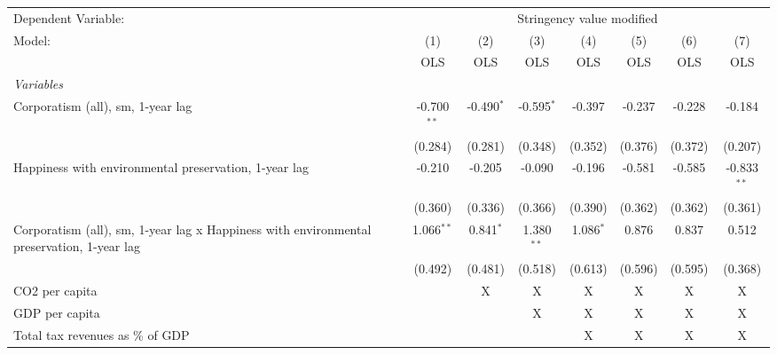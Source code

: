
\begingroup
\centering
\begin{tabular}{lccccccc}
   \toprule
   Dependent Variable: & \multicolumn{7}{c}{Stringency value modified}\\
   Model:                                                                                    & (1)           & (2)          & (3)          & (4)         & (5)     & (6)     & (7)\\  
                                                                                             &  OLS          & OLS          & OLS          & OLS         & OLS     & OLS     & OLS\\  
   \midrule
   \emph{Variables}\\
   Corporatism (all), sm, 1-year lag                                                         & -0.700$^{**}$ & -0.490$^{*}$ & -0.595$^{*}$ & -0.397      & -0.237  & -0.228  & -0.184\\   
                                                                                             & (0.284)       & (0.281)      & (0.348)      & (0.352)     & (0.376) & (0.372) & (0.207)\\   
   Happiness with environmental preservation, 1-year lag                                     & -0.210        & -0.205       & -0.090       & -0.196      & -0.581  & -0.585  & -0.833$^{**}$\\   
                                                                                             & (0.360)       & (0.336)      & (0.366)      & (0.390)     & (0.362) & (0.362) & (0.361)\\   
   Corporatism (all), sm, 1-year lag x Happiness with environmental preservation, 1-year lag & 1.066$^{**}$  & 0.841$^{*}$  & 1.380$^{**}$ & 1.086$^{*}$ & 0.876   & 0.837   & 0.512\\   
                                                                                             & (0.492)       & (0.481)      & (0.518)      & (0.613)     & (0.596) & (0.595) & (0.368)\\   
   CO2 per capita                                                                            &               & X            & X            & X           & X       & X       & X\\  
   GDP per capita                                                                            &               &              & X            & X           & X       & X       & X\\  
   Total tax revenues as \% of GDP                                                           &               &              &              & X           & X       & X       & X\\  

\end{tabular}
